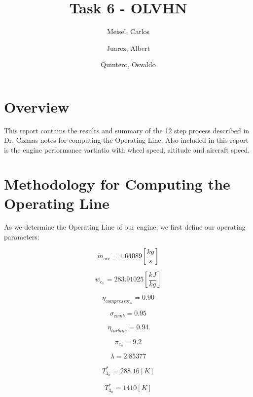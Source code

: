 \documentclass[titlepage]{article}
\author{
    Meisel, Carlos \\
  \and
  Juarez, Albert\\
  \and
    Quintero, Osvaldo\\
}
\title{Task 6 - OLVHN}
\begin{document}
  \maketitle

  \tableofcontents

\section{Overview}
This report contains the results and summary of the 12 step process described in Dr. Cizmas notes for computing the Operating Line. 
Also included in this report is the engine performance vartiatio with wheel speed, altitude and aircraft speed.

\section{Methodology for Computing the Operating Line}
As  we determine the Operating Line of our engine, we first define our 
operating parameters:

\begin{equation}
  \dot{m}_{air} = 1.64089 \left[\frac{kg}{s} \right]
\end{equation}

\begin{equation}
  w_{c_{n}} = 283.91025 \left[\frac{kJ}{kg}\right]
\end{equation}

\begin{equation}
  \eta_{compressor_{n}} = 0.90
\end{equation}

\begin{equation}
  \sigma_{comb} = 0.95
\end{equation}

\begin{equation}
  \eta_{turbine} = 0.94
\end{equation}

\begin{equation}
  \pi_{c_{n}} = 9.2
\end{equation}

\begin{equation}
  \lambda = 2.85377
\end{equation}

\begin{equation}
  T_{1_{n}}^{*} = 288.16 [K]
\end{equation}

\begin{equation}
  T_{3_{n}}^{*} = 1410 [K]
\end{equation}
\end{document}
